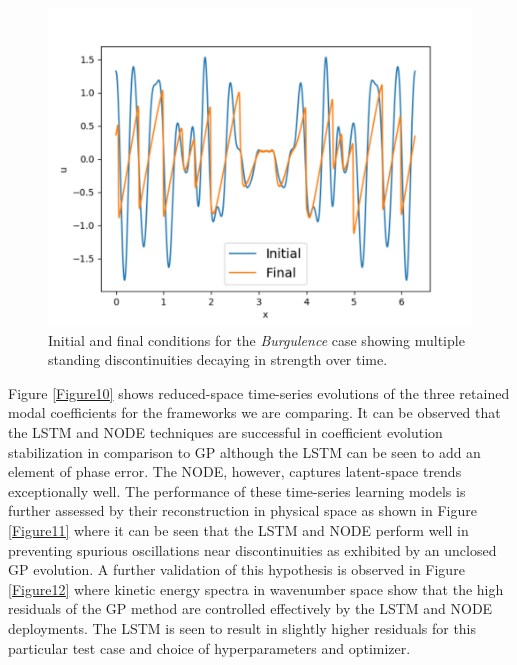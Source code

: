 \documentclass[preprint,12pt]{elsarticle}
\begin{document}
\begin{figure}
	\centering
	\includegraphics[width=\textwidth]{Figure_12.pdf}
	\caption{Initial and final conditions for the \emph{Burgulence} case showing multiple standing discontinuities decaying in strength over time.}
	\label{Figure9}
\end{figure}

Figure \ref{Figure10} shows reduced-space time-series evolutions of the three retained modal coefficients for the frameworks we are comparing. It can be observed that the LSTM and NODE techniques are successful in coefficient evolution stabilization in comparison to GP although the LSTM can be seen to add an element of phase error. The NODE, however, captures latent-space trends exceptionally well. The performance of these time-series learning models is further assessed by their reconstruction in physical space as shown in Figure \ref{Figure11} where it can be seen that the LSTM and NODE perform well in preventing spurious oscillations near discontinuities as exhibited by an unclosed GP evolution. A further validation of this hypothesis is observed in Figure \ref{Figure12} where kinetic energy spectra in wavenumber space show that the high residuals of the GP method are controlled effectively by the LSTM and NODE deployments. The LSTM is seen to result in slightly higher residuals for this particular test case and choice of hyperparameters and optimizer.
\end{document}
